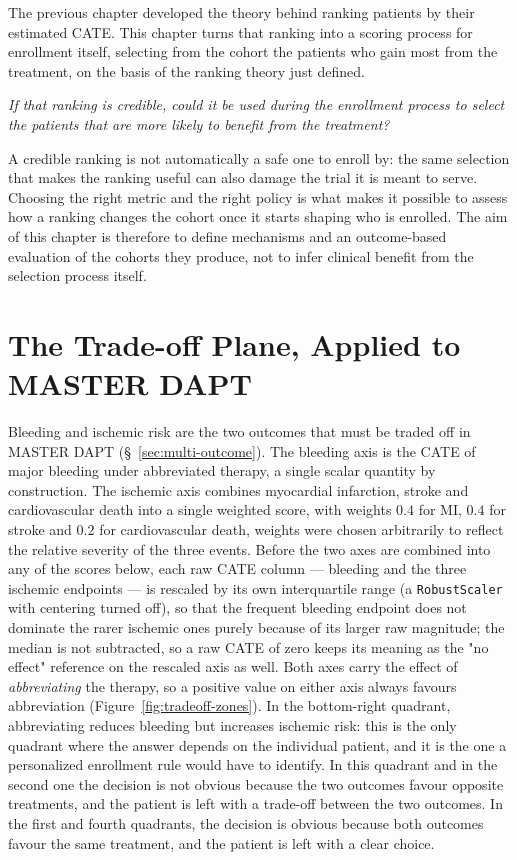 
The previous chapter developed the theory behind ranking patients by their estimated
CATE. This chapter turns that ranking into a scoring process for enrollment itself,
selecting from the cohort the patients who gain most from the treatment, on the basis of
the ranking theory just defined.

\vspace{5pt}

\textit{If that ranking is credible, could it be used during the enrollment process to select the patients that are more likely to benefit from the treatment?}

\vspace{5pt}

A credible ranking is not automatically a safe one to enroll by: the same selection that
makes the ranking useful can also damage the trial it is meant to serve. Choosing the
right metric and the right policy is what makes it possible to assess how a ranking
changes the cohort once it starts shaping who is enrolled. The aim of this chapter is
therefore to define mechanisms and an outcome-based evaluation of the cohorts they
produce, not to infer clinical benefit from the selection process itself.

\section{The Trade-off Plane, Applied to MASTER DAPT}

Bleeding and ischemic risk are the two outcomes that must be traded off in
MASTER DAPT (\S~\ref{sec:multi-outcome}). The bleeding axis is the CATE of
major bleeding under abbreviated therapy, a single scalar quantity by
construction. The ischemic axis combines myocardial infarction, stroke and
cardiovascular death into a single weighted score, with weights $0.4$ for
MI, $0.4$ for stroke and $0.2$ for cardiovascular death,
weights were chosen arbitrarily to reflect the relative severity of the three events.
Before the two axes are combined into any of the scores below, each raw CATE column ---
bleeding and the three ischemic endpoints --- is rescaled by its own interquartile range (a
\texttt{RobustScaler} with centering turned off), so that the frequent bleeding endpoint
does not dominate the rarer ischemic ones purely because of its larger raw magnitude; the
median is not subtracted, so a raw CATE of zero keeps its meaning as the "no effect"
reference on the rescaled axis as well.
Both axes carry the effect of \emph{abbreviating} the therapy, so a positive
value on either axis always favours abbreviation
(Figure~\ref{fig:tradeoff-zones}). In the bottom-right quadrant, abbreviating
reduces bleeding but increases ischemic risk: this is the only quadrant where
the answer depends on the individual patient, and it is the one a
personalized enrollment rule would have to identify.
In this quadrant and in the second one the decision is not obvious because the two outcomes
favour opposite treatments, and the patient is left with a trade-off between
the two outcomes. In the first and fourth quadrants, the decision is obvious because both outcomes
favour the same treatment, and the patient is left with a clear choice.

